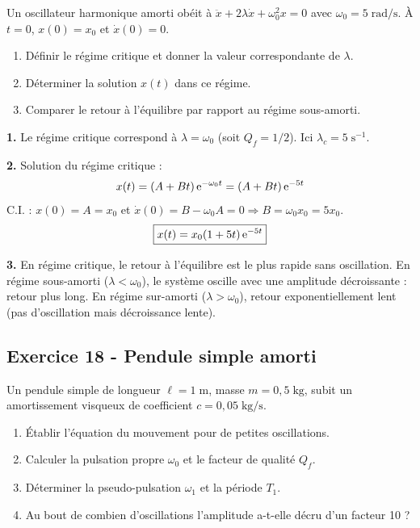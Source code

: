 \documentclass[12pt,a4paper]{article}
\begin{document}
\begin{boiteexercice}
Un oscillateur harmonique amorti obéit à $\ddot{x} + 2\lambda\dot{x} + \omega_0^2 x = 0$ avec $\omega_0 = 5\;\text{rad/s}$. À $t=0$, $x(0) = x_0$ et $\dot{x}(0) = 0$.
\begin{enumerate}
  \item Définir le régime critique et donner la valeur correspondante de $\lambda$.
  \item Déterminer la solution $x(t)$ dans ce régime.
  \item Comparer le retour à l'équilibre par rapport au régime sous-amorti.
\end{enumerate}
\end{boiteexercice}

\begin{boitecorrige}
\textbf{1.} Le régime critique correspond à $\lambda = \omega_0$ (soit $Q_f = 1/2$). Ici $\lambda_c = 5\;\text{s}^{-1}$.

\textbf{2.} Solution du régime critique :
\[
x(t) = (A + Bt)\,\mathrm{e}^{-\omega_0 t} = (A + Bt)\,\mathrm{e}^{-5t}
\]
C.I. : $x(0) = A = x_0$ et $\dot{x}(0) = B - \omega_0 A = 0 \Rightarrow B = \omega_0 x_0 = 5x_0$.
\[
\boxed{x(t) = x_0(1 + 5t)\,\mathrm{e}^{-5t}}
\]

\textbf{3.} En régime critique, le retour à l'équilibre est le plus rapide sans oscillation. En régime sous-amorti ($\lambda < \omega_0$), le système oscille avec une amplitude décroissante : retour plus long. En régime sur-amorti ($\lambda > \omega_0$), retour exponentiellement lent (pas d'oscillation mais décroissance lente).
\end{boitecorrige}

\subsection*{Exercice 18 - Pendule simple amorti \niveau{\difficile}}

\begin{boiteexercice}
Un pendule simple de longueur $\ell = 1\;\text{m}$, masse $m = 0{,}5\;\text{kg}$, subit un amortissement visqueux de coefficient $c = 0{,}05\;\text{kg/s}$.
\begin{enumerate}
  \item Établir l'équation du mouvement pour de petites oscillations.
  \item Calculer la pulsation propre $\omega_0$ et le facteur de qualité $Q_f$.
  \item Déterminer la pseudo-pulsation $\omega_1$ et la période $T_1$.
  \item Au bout de combien d'oscillations l'amplitude a-t-elle décru d'un facteur 10 ?
\end{enumerate}
\end{boiteexercice}
\end{document}

